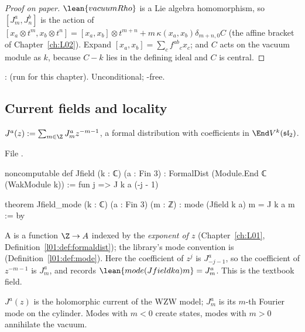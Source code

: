 \begin{proof}[Proof on paper]
$\lean{vacuumRho}$ is a Lie algebra homomorphism, so $[J^a_m,J^b_n]$ is the action of
$[x_a\otimes t^m,x_b\otimes t^n] = [x_a,x_b]\otimes t^{m+n} + m\,\kappa(x_a,x_b)\delta_{m+n,0}C$
(the affine bracket of Chapter~\ref{ch:L02}). Expand $[x_a,x_b] = \sum_cf^{ab}{}_cx_c$; and $C$ acts on
the vacuum module as $k$, because $C-k$ lies in the defining ideal and $C$ is central.
\end{proof}

\begin{status}
\allowbreak{}\allowbreak{}\allowbreak{}: \lean{[propext, Classical.}\allowbreak{}\allowbreak\lean{sound]} (run for this
chapter). Unconditional; -free.
\end{status}

\subsection{Current fields and locality}

\begin{definition}\label{l08:def:Jfield}
$J^a(z) := \sum_{m\in\Z}J^a_m z^{-m-1}$, a formal distribution with coefficients in
$\End V^k(\leightsl)$.
\end{definition}

\noindent File .
\begin{leancode}
noncomputable def Jfield (k : ℂ) (a : Fin 3) : FormalDist (Module.End ℂ (WakModule k)) :=
  fun j => J k a (-j - 1)

theorem Jfield_mode (k : ℂ) (a : Fin 3) (m : ℤ) : mode (Jfield k a) m = J k a m := by
\end{leancode}

\begin{dictionary}
A  is a function $\Z\to A$ indexed by the \emph{exponent of $z$}
(Chapter~\ref{ch:L01}, Definition~\ref{l01:def:formaldist}); the library's mode convention is
 (Definition~\ref{l01:def:mode}). Here the coefficient of $z^j$ is
$J^a_{-j-1}$, so the coefficient of $z^{-m-1}$ is $J^a_m$, and  records
$\lean{mode (Jfield k a) m} = J^a_m$. This is the textbook field.
\end{dictionary}

\begin{physics}
$J^a(z)$ is the holomorphic current of the WZW model; $J^a_m$ is its $m$-th Fourier mode on the
cylinder. Modes with $m<0$ create states, modes with $m>0$ annihilate the vacuum.
\end{physics}


